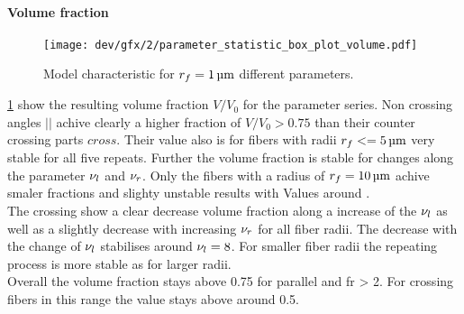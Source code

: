 \paragraph{Volume fraction}
% 
\begin{figure}[p]
\centering
\texttt{[image: dev/gfx/2/parameter\_statistic\_box\_plot\_volume.pdf]}
\caption[Model characteristics]{Model characteristic for $\fiberRadius = \SI{1}{\micro\meter}$ different parameters. }
\label{fig:psbp1}
\end{figure}
% 
\cref{fig:psbp1} show the resulting volume fraction $V/V_0$ for the parameter series.
Non crossing angles $||$ achive clearly a higher fraction of $V/V_0 > 0.75$ than their counter crossing parts $cross$.
Their value also is for fibers with radii $\fiberRadius <= \SI{5}{\micro\meter}$ very stable for all five repeats.
Further the volume fraction is stable for changes along the parameter $\textnormal{$\nu_{l}$}$ and $\textnormal{$\nu_{r}$}$. 
Only the fibers with a radius of $\fiberRadius = \SI{10}{\micro\meter}$ achive smaler fractions and slighty unstable results with Values around \dummy{}.
\\
The crossing \dummy{} show a clear decrease volume fraction along a increase of the $\textnormal{$\nu_{l}$}$ as well as a slightly decrease with increasing $\textnormal{$\nu_{r}$}$ for all fiber radii.
The decrease with the change of $\textnormal{$\nu_{l}$}$ stabilises around $\textnormal{$\nu_{l}$} = \num{8}$.
For smaller fiber radii the repeating process is more stable as for larger radii.
\\
Overall the volume fraction stays above 0.75 for parallel and fr > 2.
For crossing fibers in this range the value stays above around 0.5.
% 
